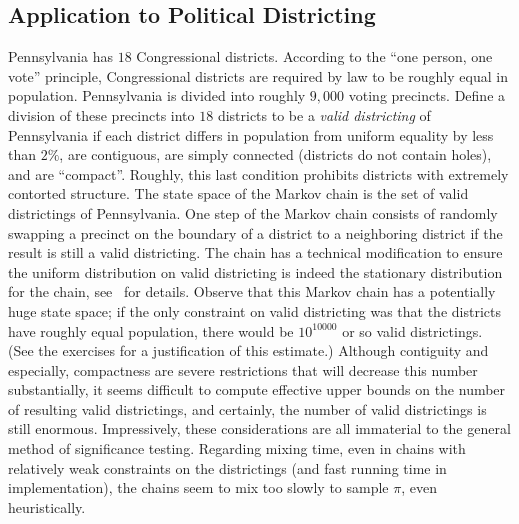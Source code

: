 \documentclass[12pt]{article}
\begin{document}
\subsection*{Application to Political Districting}

Pennsylvania has \( 18 \) Congressional districts.  According to the
``one person, one vote'' principle, Congressional districts are required
by law to be roughly equal in population. Pennsylvania is divided into
roughly \( 9,000 \) voting precincts.  Define a division of these
precincts into \( 18 \) districts to be a \emph{valid districting} of
Pennsylvania if each district differs in population from uniform
equality by less than \( 2\% \), are contiguous, are simply connected (districts
do not contain holes), and are ``compact''.  Roughly, this last
condition prohibits districts with extremely contorted structure.  The
state space of the Markov chain is the set of valid districtings of
Pennsylvania. One step of the Markov chain consists of randomly swapping
a precinct on the boundary of a district to a neighboring district if
the result is still a valid districting.  The chain has a technical
modification to ensure the uniform distribution on valid districting is
indeed the stationary distribution for the chain, see~%
\cite{chikina2860si} for details. Observe that this Markov chain has a
potentially huge state space; if the only constraint on valid
districting was that the districts have roughly equal population, there
would be \( 10^{10000} \) or so valid districtings.  (See the exercises
for a justification of this estimate.) Although contiguity and
especially, compactness are severe restrictions that will decrease this
number substantially, it seems difficult to compute effective upper
bounds on the number of resulting valid districtings, and certainly, the
number of valid districtings is still enormous.  Impressively, these
considerations are all immaterial to the general method of significance
testing.  Regarding mixing time, even in chains with relatively weak
constraints on the districtings (and fast running time in implementation),
the chains seem to mix too slowly to sample \( \pi \), even
heuristically.
\end{document}
